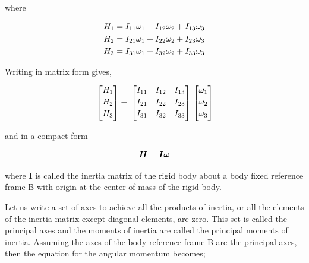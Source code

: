 where

\begin{align}{\label{eqn:angularMomentum1}}
\begin{split}
H_1 & = I_{11} \omega_1 + I_{12} \omega_2 + I_{13} \omega_3 \\
H_2 & = I_{21} \omega_1 + I_{22} \omega_2 + I_{23} \omega_3 \\
H_3 & = I_{31} \omega_1 + I_{32} \omega_2 + I_{33} \omega_3 \\
\end{split}
\end{align}

Writing in matrix form gives,

\begin{equation}{\label{eqn:angularMomentumInMatrixForm}}
\begin{bmatrix}
H_1\\[0.2em]
H_2\\[0.2em]
H_3\\[0.2em]
\end{bmatrix}
 =\,
\begin{bmatrix}
I_{11} & I_{12} & I_{13} \\[0.2em]
I_{21} & I_{22} & I_{23} \\[0.2em]
I_{31} & I_{32} &I_{33} \\[0.2em]
\end{bmatrix}
\,
\begin{bmatrix}
\omega_1\\[0.2em]
\omega_2\\[0.2em]
\omega_3\\[0.2em]
\end{bmatrix}
\end{equation}

and in a compact form

\begin{equation}{\label{eqn:angMomentumComp2}}
\bm{H} = \bm{I} \bm{\omega}
\end{equation}

where $\bm{I}$  is called the inertia matrix of the rigid body about a body fixed reference frame B with origin at the center of mass of the rigid body.

Let us write a set of axes to achieve all the products of inertia, or all the elements of the inertia matrix except diagonal elements, are zero. 
This set is called the principal axes and the moments of inertia are called the principal moments of inertia. 
Assuming the axes of the body reference frame B are the principal axes, then the equation for the angular momentum becomes;

